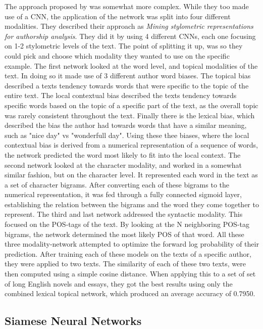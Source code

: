 The approach proposed by \citet{ding2016} was somewhat more complex. While they
too made use of a \gls{CNN}, the application of the network was split into
four different modalities. They described their approach as \textit{Mining
stylometric representations for authorship analysis}. They did it by using 4
different \gls{CNN}s, each one focusing on 1-2 stylometric levels of the text.
The point of splitting it up, was so they could pick and choose which modality
they wanted to use on the specific example. The first network looked at the
word level, and topical modalities of the text. In doing so it made use of
3 different author word biases. The topical bias described a texts tendency
towards words that were specific to the topic of the entire text. The local
contextual bias described the texts tendency towards specific words based on the
topic of a specific part of the text, as the overall topic was rarely consistent
throughout the text. Finally there is the lexical bias, which described the bias
the author had towards words that have a similar meaning, such as "nice day"
vs "wonderfull day". Using these thee biases, where the local contextual bias
is derived from a numerical representation of a sequence of words, the network
predicted the word most likely to fit into the local context. The second network
looked at the character modality, and worked in a somewhat similar fashion,
but on the character level. It represented each word in the text as a set of
character bigrams. After converting each of these bigrams to the numerical
representation, it was fed through a fully connected sigmoid layer, establishing
the relation between the bigrams and the word they come together to represent.
The third and last network addressed the syntactic modality. This focused on
the \gls{POS}-tags of the text. By looking at the N neighboring \gls{POS}-tag
bigrams, the network determined the most likely \gls{POS} of that word. All
these three modality-network attempted to optimize the forward log probability
of their prediction. After training each of these models on the texts of a
specific author, they were applied to two texts. The similarity of each of these
two texts, were then computed using a simple cosine distance. When applying this
to a set of set of long English novels and essays, they got the best results
using only the combined lexical topical network, which produced an average
accuracy of 0.7950.


\subsection{Siamese Neural Networks}

